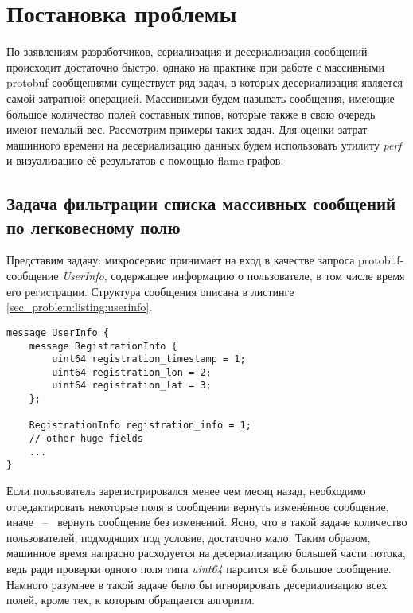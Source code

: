 \section{Постановка проблемы}
\label{sec_problem}

По заявлениям разработчиков, сериализация и десериализация сообщений происходит достаточно быстро, однако
на практике при работе с массивными protobuf-сообщениями существует ряд задач, в которых десериализация является самой затратной операцией.
Массивными будем называть сообщения, имеющие большое количество полей составных типов, которые также в свою очередь имеют немалый вес.
Рассмотрим примеры таких задач. Для оценки затрат машинного времени на десериализацию данных будем использовать утилиту \textit{perf} и визуализацию её результатов с помощью flame-графов.

\subsection{Задача фильтрации списка массивных сообщений по легковесному полю}
\label{sec_problem:sec:problem1}

Представим задачу: микросервис принимает на вход в качестве запроса protobuf-сообщение \textit{UserInfo}, содержащее информацию о пользователе,
в том числе время его регистрации. Структура сообщения описана в листинге \ref{sec_problem:listing:userinfo}.

\begin{lstlisting}[style=CodeListing, label={sec_problem:listing:userinfo}, caption={Protobuf-сообщение UserInfo}]
message UserInfo {
    message RegistrationInfo {
        uint64 registration_timestamp = 1;
        uint64 registration_lon = 2;
        uint64 registration_lat = 3;
    };

    RegistrationInfo registration_info = 1;
    // other huge fields
    ... 
}
\end{lstlisting}

Если пользователь зарегистрировался менее чем месяц назад, необходимо отредактировать некоторые поля в сообщении вернуть изменённое сообщение,
иначе ~--~ вернуть сообщение без изменений. Ясно, что в такой задаче количество пользователей, подходящих под условие, достаточно мало.
Таким образом, машинное время напрасно расходуется на десериализацию большей части потока, ведь ради проверки одного поля типа \textit{uint64} парсится всё большое сообщение.
Намного разумнее в такой задаче было бы игнорировать десериализацию всех полей, кроме тех, к которым обращается алгоритм.

